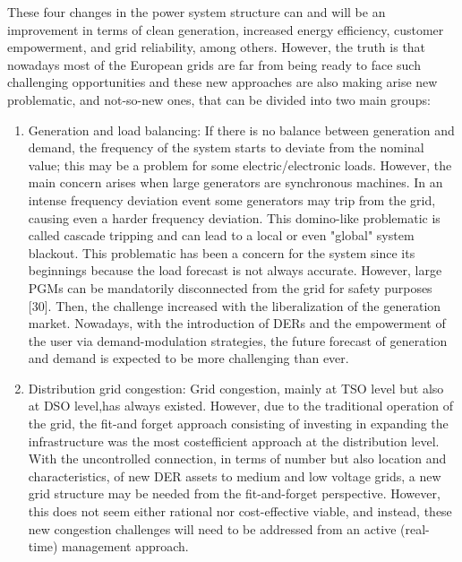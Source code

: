 These four changes in the power system structure can and will be an improvement in terms of clean generation, increased energy efficiency, customer empowerment, and grid reliability, among others. However, the truth is that nowadays most of the European grids are far from being ready to face such challenging opportunities and these new approaches are also making arise new problematic, and not-so-new ones, that can be divided into two main groups: 
\begin{enumerate}
\item Generation and load balancing: If there is no balance between generation and demand, the frequency of the system starts to deviate from the nominal value; this may be a problem for some electric/electronic loads. However, the main concern arises when large generators are synchronous machines. In an intense frequency deviation event some generators may trip from the grid, causing even a harder frequency deviation. This domino-like problematic is called cascade tripping and can lead to a local or even "global" system blackout. This problematic has been a concern for the system since its beginnings because the load forecast is not always accurate. However, large PGMs can be mandatorily disconnected from the grid for safety purposes [30]. Then, the challenge increased with the liberalization of the generation market. Nowadays, with the introduction of DERs and the empowerment of the user via demand-modulation strategies, the future forecast of generation and demand is expected to be more challenging than ever.

\item Distribution grid congestion: Grid congestion, mainly at TSO level but also at DSO level,has always existed. However, due to the traditional operation of the grid, the fit-and forget approach consisting of investing in expanding the infrastructure was the most costefficient approach at the distribution level. With the uncontrolled connection, in terms of number but also location and characteristics, of new DER assets to medium and low voltage grids, a new grid structure may be needed from the fit-and-forget perspective. However, this does not seem either rational nor cost-effective viable, and instead, these new congestion challenges will need to be addressed from an active (real-time) management approach.
\end{enumerate}


